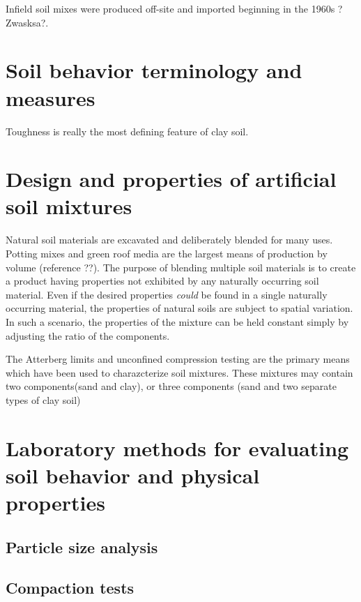 \documentclass[
]{book}
\begin{document}
Infield soil mixes were produced off-site and imported beginning in the 1960s ?Zwasksa?.

\hypertarget{soil-behavior-fundamentals}{%
\section{Soil behavior terminology and measures}\label{soil-behavior-fundamentals}}

Toughness is really the most defining feature of clay soil.

\hypertarget{artificial-soil-mixtures}{%
\section{Design and properties of artificial soil mixtures}\label{artificial-soil-mixtures}}

Natural soil materials are excavated and deliberately blended for many uses. Potting mixes and green roof media are the largest means of production by volume (reference ??). The purpose of blending multiple soil materials is to create a product having properties not exhibited by any naturally occurring soil material. Even if the desired properties \emph{could} be found in a single naturally occurring material, the properties of natural soils are subject to spatial variation. In such a scenario, the properties of the mixture can be held constant simply by adjusting the ratio of the components.

The Atterberg limits and unconfined compression testing are the primary means which have been used to charazcterize soil mixtures. These mixtures may contain two components(sand and clay), or three components (sand and two separate types of clay soil)

\hypertarget{lab-methods-review}{%
\section{Laboratory methods for evaluating soil behavior and physical properties}\label{lab-methods-review}}

\hypertarget{particle-size-analysis}{%
\subsection{Particle size analysis}\label{particle-size-analysis}}

\hypertarget{compaction-tests}{%
\subsection{Compaction tests}\label{compaction-tests}}
\end{document}
